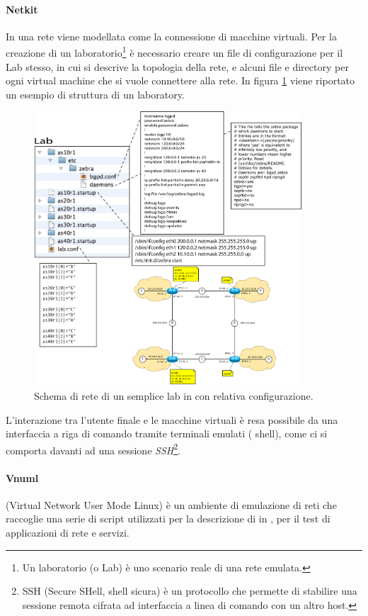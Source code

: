 \paragraph{Netkit}In \netkit{} una rete viene modellata come la connessione di macchine virtuali. Per la creazione di un laboratorio\footnote{Un laboratorio (o Lab) è uno scenario reale di una rete emulata.} è necessario creare un file di configurazione per il Lab stesso, in cui si descrive la topologia della rete, e alcuni file e directory per ogni virtual machine che si vuole connettere alla rete. In figura \ref{figura:netkit_lab} viene riportato un esempio di struttura di un \netkit{} laboratory.

\begin{figure}[!ht]
	\centering
	\includegraphics[width=10cm]{images/netkit_lab.png}
	\caption{Schema di rete di un semplice lab in \netkit{} con relativa configurazione.}
	\label{figura:netkit_lab}
\end{figure}

L'interazione tra l'utente finale e le macchine virtuali è resa possibile da una interfaccia a riga di comando tramite terminali emulati (\linux{} shell), come ci si comporta davanti ad una sessione \emph{SSH}\footnote{SSH (Secure SHell, shell sicura) è un protocollo che permette di stabilire una sessione remota cifrata ad interfaccia a linea di comando con un altro host.}.


\paragraph{Vnuml}\cite{VNUMLT} (Virtual Network User Mode Linux) è un ambiente di emulazione di reti che raccoglie una serie di script utilizzati per la descrizione di \testbed{} in \xml{}, per il test di applicazioni di rete e servizi.

